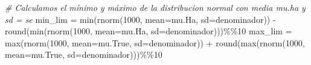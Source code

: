 \documentclass[]{article}
\newenvironment{Shaded}{\begin{snugshade}}{\end{snugshade}}
\newcommand{\AttributeTok}[1]{\textcolor[rgb]{0.77,0.63,0.00}{#1}}
\newcommand{\CommentTok}[1]{\textcolor[rgb]{0.56,0.35,0.01}{\textit{#1}}}
\newcommand{\DecValTok}[1]{\textcolor[rgb]{0.00,0.00,0.81}{#1}}
\newcommand{\FunctionTok}[1]{\textcolor[rgb]{0.00,0.00,0.00}{#1}}
\newcommand{\NormalTok}[1]{#1}
\newcommand{\OtherTok}[1]{\textcolor[rgb]{0.56,0.35,0.01}{#1}}
\newcommand{\SpecialCharTok}[1]{\textcolor[rgb]{0.00,0.00,0.00}{#1}}
\begin{document}
\begin{Shaded}
\begin{Highlighting}[]
    
        \CommentTok{\# Calculamos el mínimo y máximo de la distribucion normal con media mu.ha y sd = se}
\NormalTok{    min\_lim }\OtherTok{=} \FunctionTok{min}\NormalTok{(}\FunctionTok{rnorm}\NormalTok{(}\DecValTok{1000}\NormalTok{, }\AttributeTok{mean=}\NormalTok{mu.Ha, }\AttributeTok{sd=}\NormalTok{denominador)) }\SpecialCharTok{{-}} 
      \FunctionTok{round}\NormalTok{(}\FunctionTok{min}\NormalTok{(}\FunctionTok{rnorm}\NormalTok{(}\DecValTok{1000}\NormalTok{, }\AttributeTok{mean=}\NormalTok{mu.Ha, }\AttributeTok{sd=}\NormalTok{denominador)))}\SpecialCharTok{\%\%}\DecValTok{10}
\NormalTok{    max\_lim }\OtherTok{=} \FunctionTok{max}\NormalTok{(}\FunctionTok{rnorm}\NormalTok{(}\DecValTok{1000}\NormalTok{, }\AttributeTok{mean=}\NormalTok{mu.True, }\AttributeTok{sd=}\NormalTok{denominador)) }\SpecialCharTok{+}
      \FunctionTok{round}\NormalTok{(}\FunctionTok{max}\NormalTok{(}\FunctionTok{rnorm}\NormalTok{(}\DecValTok{1000}\NormalTok{, }\AttributeTok{mean=}\NormalTok{mu.True, }\AttributeTok{sd=}\NormalTok{denominador)))}\SpecialCharTok{\%\%}\DecValTok{10}
      

\end{Highlighting}
\end{Shaded}
\end{document}
